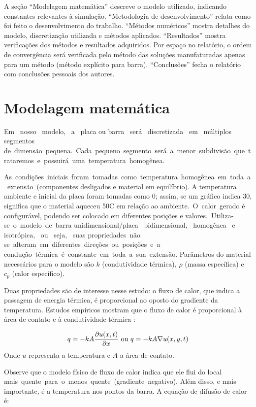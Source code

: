 \documentclass[12pt,fleqn]{article}
\begin{document}
A seção ``Modelagem matemática'' descreve o modelo utilizado, indicando constantes relevantes à simulação. ``Metodologia de desenvolvimento'' relata como foi feito o desenvolvimento do trabalho. ``Métodos numéricos'' mostra detalhes do modelo, discretização utilizada e métodos aplicados. ``Resultados'' mostra verificações dos métodos e resultados adquiridos. Por espaço no relatório, o ordem de convergência será verificada pelo método das soluções manufaturadas apenas para um método (método explícito para barra). ``Conclusões'' fecha o relatório com conclusões pessoais dos autores.

\section{Modelagem matemática}
Em  nosso  modelo,  a  placa ou barra  será  discretizada  em  múltiplos  segmentos  de dimensão pequena. Cada pequeno segmento será a menor subdivisão que trataremos e possuirá uma temperatura homogênea.

As condições iniciais foram tomadas como temperatura homogênea em toda a extensão (componentes desligados e material em equilíbrio). A temperatura ambiente e inicial da placa foram tomadas como 0; assim, se um gráfico indica 30, significa que o material aqueceu 50\textdegree C em relação ao ambiente. O calor gerado é configurável, podendo ser colocado em diferentes posições e valores. Utiliza­-se o modelo de barra unidimensional/placa  bidimensional,  homogênea  e  isotrópica,  ou  seja,  suas propriedades não  se alteram em diferentes direções ou posições e a  condução térmica é constante em toda a sua extensão. Parâmetros do material necessários para o modelo são $k$ (condutividade térmica), $\rho$ (massa específica) e $c_p$ (calor específico).

Duas propriedades são de interesse nesse estudo: o fluxo de calor, que indica a passagem de energia térmica, é proporcional ao oposto do gradiente da temperatura. Estudos empiricos mostram que o fluxo de calor é proporcional à área de contato e à condutividade térmica \cite{ufsc_geracao_de_calor}:

\[q = -k A \frac{\partial u(x, t)}{\partial x} $ ou $ q = -k A \nabla u(x, y, t)\]
Onde $u$ representa a temperatura e $A$ a área de contato.

Observe que o modelo físico de fluxo de calor indica que ele flui do local mais quente para o menos quente (gradiente negativo). Além disso, e mais importante, é a temperatura nos pontos da barra. A equação de difusão de calor é:
\end{document}
